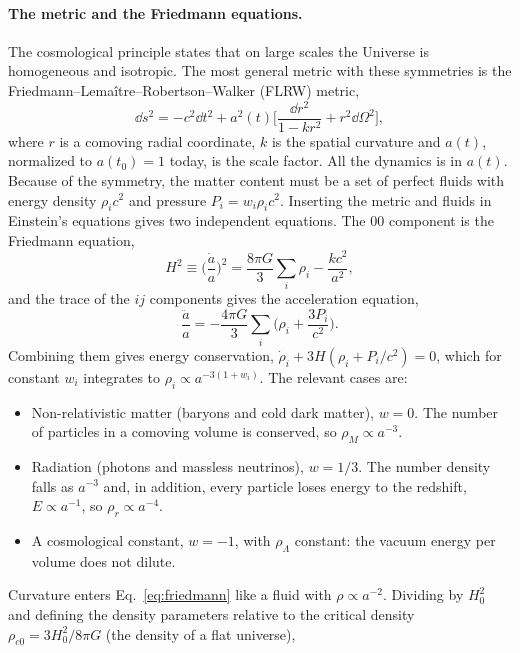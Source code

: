 \paragraph*{The metric and the Friedmann equations.} The cosmological principle states that on large scales the
Universe is homogeneous and isotropic. The most general metric with these symmetries is the
Friedmann--Lema\^itre--Robertson--Walker (FLRW) metric,
\begin{equation}
\dd s^2 = -c^2\dd t^2 + a^2(t)\Big[\frac{\dd r^2}{1-kr^2} + r^2\dd\Omega^2\Big],
\end{equation}
where $r$ is a comoving radial coordinate, $k$ is the spatial curvature and $a(t)$, normalized to $a(t_0)=1$ today,
is the scale factor. All the dynamics is in $a(t)$. Because of the symmetry, the matter content must be a set of
perfect fluids with energy density $\rho_i c^2$ and pressure $P_i=w_i\rho_ic^2$. Inserting the metric and fluids in
Einstein's equations gives two independent equations. The $00$ component is the Friedmann equation,
\begin{equation}
H^2\equiv\Big(\frac{\dot a}{a}\Big)^2 = \frac{8\pi G}{3}\sum_i\rho_i - \frac{kc^2}{a^2},
\label{eq:friedmann}
\end{equation}
and the trace of the $ij$ components gives the acceleration equation,
\begin{equation}
\frac{\ddot a}{a} = -\frac{4\pi G}{3}\sum_i\Big(\rho_i+\frac{3P_i}{c^2}\Big).
\label{eq:accel}
\end{equation}
Combining them gives energy conservation, $\dot\rho_i+3H(\rho_i+P_i/c^2)=0$, which for constant $w_i$ integrates to
$\rho_i\propto a^{-3(1+w_i)}$. The relevant cases are:
\begin{itemize}
\item Non-relativistic matter (baryons and cold dark matter), $w=0$. The number of particles in a comoving volume is
      conserved, so $\rho_M\propto a^{-3}$.
\item Radiation (photons and massless neutrinos), $w=1/3$. The number density falls as $a^{-3}$ and, in addition, every
      particle loses energy to the redshift, $E\propto a^{-1}$, so $\rho_r\propto a^{-4}$.
\item A cosmological constant, $w=-1$, with $\rho_\Lambda$ constant: the vacuum energy per volume does not dilute.
\end{itemize}
Curvature enters Eq.~\eqref{eq:friedmann} like a fluid with $\rho\propto a^{-2}$. Dividing by $H_0^2$ and defining
the density parameters relative to the critical density $\rho_{c0}=3H_0^2/8\pi G$ (the density of a flat universe),
